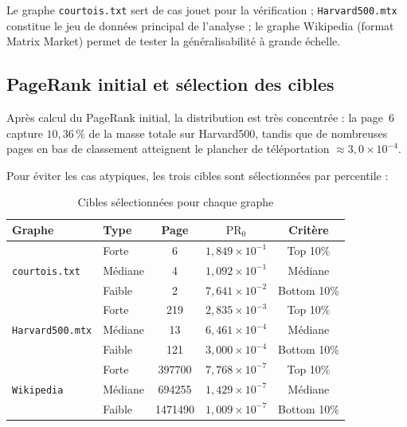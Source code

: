 \documentclass[12pt,a4paper]{article}
\newcommand{\PR}{\mathrm{PR}}
\theoremstyle{definition}
\begin{document}
\noindent Le graphe \texttt{courtois.txt} sert de cas jouet pour la v\'{e}rification ;
\texttt{Harvard500.mtx} constitue le jeu de donn\'{e}es principal de l'analyse ;
le graphe Wikipedia (format Matrix Market) permet de tester la g\'{e}n\'{e}ralisabilit\'{e}
\`{a} grande \'{e}chelle.

\subsection{PageRank initial et s\'{e}lection des cibles}

Apr\`{e}s calcul du PageRank initial, la distribution est tr\`{e}s concentr\'{e}e :
la page~6 capture $10{,}36\,\%$ de la masse totale sur Harvard500, tandis que de nombreuses
pages en bas de classement atteignent le plancher de t\'{e}l\'{e}portation
$\approx 3{,}0 \times 10^{-4}$.

Pour \'{e}viter les cas atypiques, les trois cibles sont s\'{e}lectionn\'{e}es par
percentile :

\begin{table}[H]
\centering
\caption{Cibles s\'{e}lectionn\'{e}es pour chaque graphe}
\label{tab:cibles}
\small
\begin{tabular}{llccc}
\toprule
\textbf{Graphe} & \textbf{Type} & \textbf{Page} & \textbf{$\PR_0$} & \textbf{Crit\`{e}re} \\
\midrule
\multirow{3}{*}{\texttt{courtois.txt}}
 & Forte   & 6  & $1{,}849 \times 10^{-1}$ & Top 10\% \\
 & M\'{e}diane & 4  & $1{,}092 \times 10^{-1}$ & M\'{e}diane \\
 & Faible  & 2  & $7{,}641 \times 10^{-2}$ & Bottom 10\% \\
\midrule
\multirow{3}{*}{\texttt{Harvard500.mtx}}
 & Forte   & 219 & $2{,}835 \times 10^{-3}$ & Top 10\% \\
 & M\'{e}diane & 13  & $6{,}461 \times 10^{-4}$ & M\'{e}diane \\
 & Faible  & 121 & $3{,}000 \times 10^{-4}$ & Bottom 10\% \\
\midrule
\multirow{3}{*}{\texttt{Wikipedia}}
 & Forte   & 397700  & $7{,}768 \times 10^{-7}$ & Top 10\% \\
 & M\'{e}diane & 694255  & $1{,}429 \times 10^{-7}$ & M\'{e}diane \\
 & Faible  & 1471490 & $1{,}009 \times 10^{-7}$ & Bottom 10\% \\
\bottomrule
\end{tabular}
\end{table}
\end{document}

